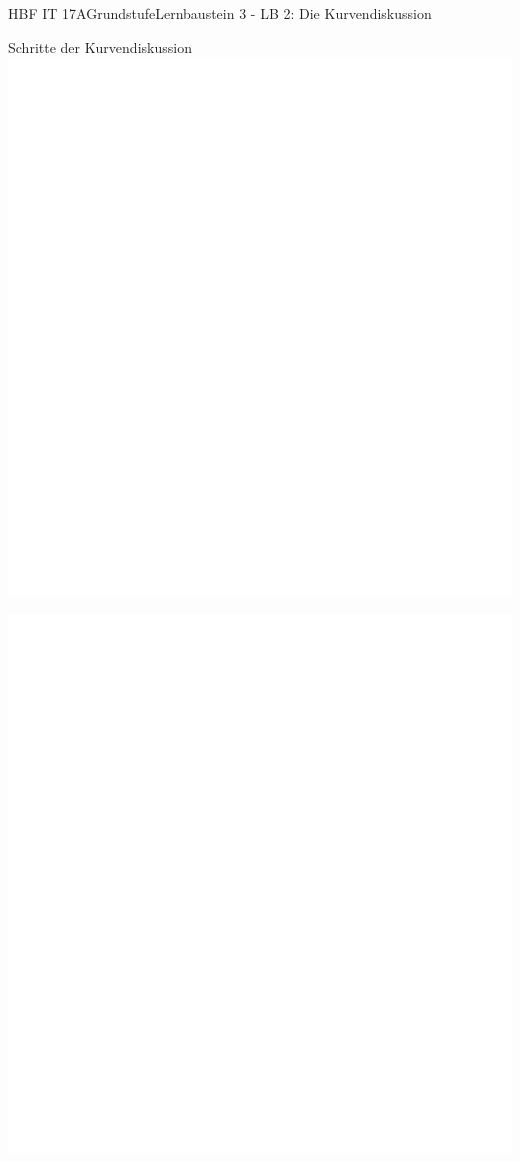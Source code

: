 \documentclass[oneside,openany,headings=optiontotoc,11pt,numbers=noenddot]{scrreprt}
\begin{document}
	\begin{worksheet}{HBF IT 17A}{Grundstufe}{Lernbaustein 3 - LB 2: Die Kurvendiskussion}

		\begin{framed}
			\noindent
			\tiny{\color{codegray}Schritte der Kurvendiskussion}\\
			\includegraphics[scale=1.5]{../empty.jpg}
		\end{framed}
		\begin{framed}
			\includegraphics[scale=1.5]{../empty.jpg}
		\end{framed}
	\end{worksheet}
\end{document}
